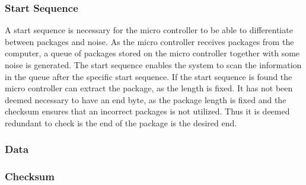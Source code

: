 \subsubsection{Start Sequence}
A start sequence is necessary for the micro controller to be able to differentiate between packages and noise. As the micro controller receives packages from the computer, a queue of packages stored on the micro controller together with some noise is generated. The start sequence enables the system to scan the information in the queue after the specific start sequence. If the start sequence is found the micro controller can extract the package, as the length is fixed. It has not been deemed necessary to have an end byte, as the package length is fixed and the checksum ensures that an incorrect packages is not utilized. Thus it is deemed redundant to check is the end of the package is the desired end.

\subsubsection{Data}










\subsubsection{Checksum}







